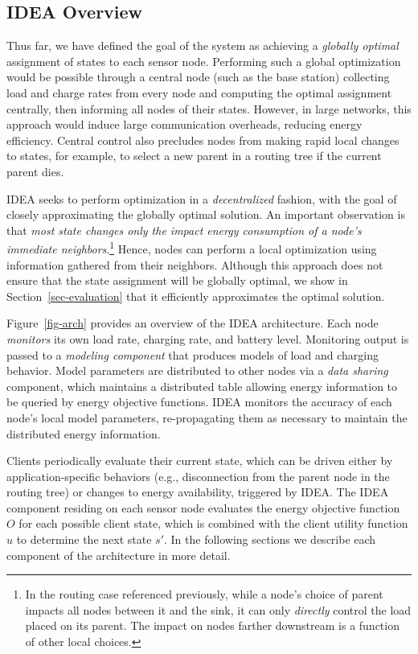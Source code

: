 \documentclass{sig-alternate}
\begin{document}
\subsection{IDEA Overview}

Thus far, we have defined the goal of the system as achieving a
\textit{globally optimal} assignment of states to each sensor node.
Performing such a global optimization would be possible through a central
node (such as the base station) collecting load and charge rates from every
node and computing the optimal assignment centrally, then informing all nodes
of their states. However, in large networks, this approach would induce large
communication overheads, reducing energy efficiency. Central control also
precludes nodes from making rapid local changes to states, for example, to
select a new parent in a routing tree if the current parent dies.

IDEA seeks to perform optimization in a \textit{decentralized} fashion, with
the goal of closely approximating the globally optimal solution. An important
observation is that \textit{most state changes only the impact energy
consumption of a node's immediate neighbors}.\footnote{In the routing case
referenced previously, while a node's choice of parent impacts all nodes
between it and the sink, it can only \textit{directly} control the load
placed on its parent. The impact on nodes farther downstream is a function of
other local choices.} Hence, nodes can perform a local optimization using
information gathered from their neighbors. Although this approach does not
ensure that the state assignment will be globally optimal, we show in
Section~\ref{sec-evaluation} that it efficiently approximates the optimal
solution.

Figure~\ref{fig-arch} provides an overview of the IDEA architecture. Each
node \textit{monitors} its own load rate, charging rate, and battery level.
Monitoring output is passed to a \textit{modeling component} that produces
models of load and charging behavior. Model parameters are distributed to
other nodes via a \textit{data sharing} component, which maintains a
distributed table allowing energy information to be queried by energy
objective functions. IDEA monitors the accuracy of each node's local model
parameters, re-propagating them as necessary to maintain the distributed
energy information.

Clients periodically evaluate their current state, which can be driven either
by application-specific behaviors (e.g., disconnection from the parent node
in the routing tree) or changes to energy availability, triggered by IDEA.
The IDEA component residing on each sensor node evaluates the energy
objective function $O$ for each possible client state, which is combined with
the client utility function $u$ to determine the next state $s'$. In the
following sections we describe each component of the architecture in more
detail.
\end{document}
